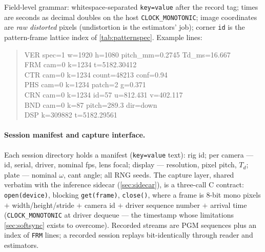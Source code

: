 \documentclass[11pt]{article}
\theoremstyle{definition}
\newcommand{\code}[1]{\texttt{#1}}
\begin{document}
Field-level grammar: whitespace-separated \code{key=value} after the
record tag; times are seconds as decimal doubles on the host
\code{CLOCK\_MONOTONIC}; image coordinates are \emph{raw distorted}
pixels (undistortion is the estimators' job); corner \code{id} is the
pattern-frame lattice index of \autoref{tab:patternspec}. Example
lines:
\begin{quote}\ttfamily\footnotesize
VER spec=1 w=1920 h=1080 pitch\_mm=0.2745 Td\_ms=16.667\\
FRM cam=0 k=1234 t=5182.30412\\
CTR cam=0 k=1234 count=48213 conf=0.94\\
PHS cam=0 k=1234 patch=2 g=0.371\\
CRN cam=0 k=1234 id=57 u=812.431 v=402.117\\
BND cam=0 k=87 pitch=289.3 dir=down\\
DSP k=309882 t=5182.29561
\end{quote}

\paragraph{Session manifest and capture interface.} Each session
directory holds a manifest (\code{key=value} text): rig id; per camera
--- id, serial, driver, nominal fps, lens focal; display --- resolution,
pixel pitch, $T_d$; plate --- nominal $\omega$, cant angle; all RNG
seeds. The capture layer, shared verbatim with the inference sidecar
(\autoref{sec:sidecar}), is a three-call C contract:
\code{open(device)}, blocking \code{get(frame)}, \code{close()}, where a
frame is 8-bit mono pixels $+$ width/height/stride $+$ camera id $+$
driver sequence number $+$ arrival time (\code{CLOCK\_MONOTONIC} at
driver dequeue --- the timestamp whose limitations
\autoref{sec:softsync} exists to overcome). Recorded streams are PGM
sequences plus an index of \code{FRM} lines; a recorded session replays
bit-identically through reader and estimators.
\end{document}
